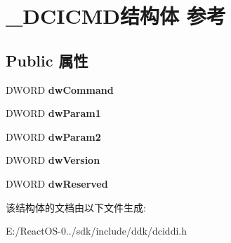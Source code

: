 \hypertarget{struct___d_c_i_c_m_d}{}\section{\+\_\+\+D\+C\+I\+C\+M\+D结构体 参考}
\label{struct___d_c_i_c_m_d}
\subsection*{Public 属性}
\begin{DoxyCompactItemize}
\item 
\mbox{\label{struct___d_c_i_c_m_d_a65e23ecb3a29ac34744bde3d4e805c7f}} 
D\+W\+O\+RD {\bfseries dw\+Command}
\item 
\mbox{\label{struct___d_c_i_c_m_d_a5a6eac08ccc4c31d31a01646756e6a24}} 
D\+W\+O\+RD {\bfseries dw\+Param1}
\item 
\mbox{\label{struct___d_c_i_c_m_d_ab580ae2e42b08a0576591dfbdb0479db}} 
D\+W\+O\+RD {\bfseries dw\+Param2}
\item 
\mbox{\label{struct___d_c_i_c_m_d_a37101dcbfcdd494b0ce9a4f0cc5447c5}} 
D\+W\+O\+RD {\bfseries dw\+Version}
\item 
\mbox{\label{struct___d_c_i_c_m_d_a5457ee582d2d90d24fabf15e7b9277f7}} 
D\+W\+O\+RD {\bfseries dw\+Reserved}
\end{DoxyCompactItemize}


该结构体的文档由以下文件生成\+:\begin{DoxyCompactItemize}
\item 
E\+:/\+React\+O\+S-\/0../sdk/include/ddk/dciddi.\+h\end{DoxyCompactItemize}
